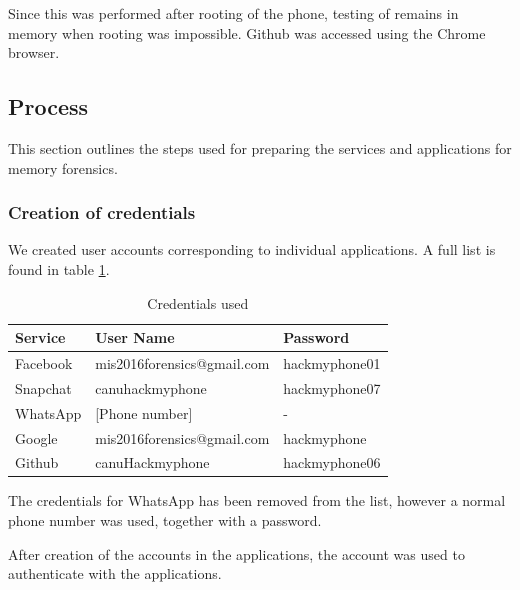 Since this was performed after rooting of the phone, testing of remains in memory when rooting was impossible. Github was accessed using the Chrome browser.
\subsection{Process} %
This section outlines the steps used for preparing the services and applications for memory forensics.

\subsubsection{Creation of credentials}
We created user accounts corresponding to individual applications. A full list is found in table \ref{tbl:credentials}.\\
\begin{table}
\begin{tabular}{l|l|l}
Service & User Name & Password \\ 
\hline 
Facebook & mis2016forensics@gmail.com & hackmyphone01 \\ 
Snapchat & canuhackmyphone & hackmyphone07 \\ 
WhatsApp & [Phone number] & - \\ 
Google & mis2016forensics@gmail.com & hackmyphone \\ 
Github & canuHackmyphone & hackmyphone06 \\ 
\end{tabular} 
\caption{Credentials used}
\label{tbl:credentials}
\end{table}

The credentials for WhatsApp has been removed from the list, however a normal phone number was used, together with a password.

After creation of the accounts in the applications, the account was used to authenticate with the applications.

